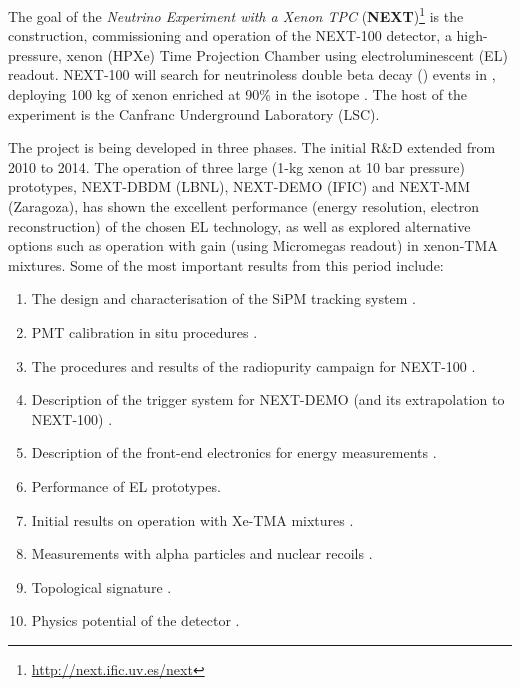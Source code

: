 
The goal of the {\em Neutrino Experiment with a Xenon TPC} ({\bf NEXT})\footnote{\url{http://next.ific.uv.es/next}} is the construction, commissioning and operation of the NEXT-100 detector, a high-pressure, xenon (HPXe) Time Projection Chamber using electroluminescent (EL) readout. NEXT-100 will search for neutrinoless double beta decay  (\bbonu) events in \XE, deploying 100 kg of xenon enriched at 90\% in the isotope \XE. The host of the experiment is the Canfranc Underground Laboratory (LSC). 

The project is being developed in three phases. The initial R\&D extended from 2010 to 2014. The operation of three large (1-kg xenon at 10 bar pressure) prototypes, 
NEXT-DBDM (LBNL), NEXT-DEMO (IFIC) and NEXT-MM (Zaragoza), has shown the excellent performance (energy resolution, electron reconstruction) of the chosen EL technology, as well as explored alternative options such as operation with gain (using Micromegas readout) in xenon-TMA mixtures. 
Some of the most important results from this period include:

\begin{enumerate}
\item The design and characterisation of the SiPM tracking system \cite{Alvarez:2012haa}.
\item PMT calibration in situ procedures \cite{Freitas:2015tha}.
\item The procedures and results of the radiopurity campaign for NEXT-100 \cite{Alvarez:2012as, Alvarez:2014kvs, Cebrian:2015jna}.
\item Description of the trigger system for NEXT-DEMO (and its extrapolation to NEXT-100)
\cite{Esteve:2012hy}.
\item Description of the front-end electronics for energy measurements \cite{Gil:2012sr}.  
\item Performance of EL prototypes\cite{Alvarez:2012hh, Alvarez:2013gxa, Alvarez:2012hu,Lorca:2014sra}.   
\item Initial results on operation with Xe-TMA mixtures \cite{Alvarez:2013kqa, Alvarez:2013oha}.
\item Measurements with alpha particles and nuclear recoils \cite{Renner:2014mha, Serra:2014zda}.
\item Topological signature \cite{Ferrario:2015kta}.
\item Physics potential of the detector \cite{GomezCadenas:2012jv, MartinAlbo:2013ve,Gomez-Cadenas:2013lta, Martin-Albo:2015rhw}.              
\end{enumerate}

